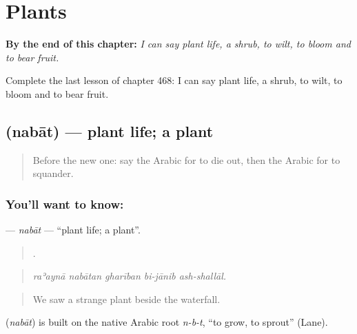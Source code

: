 
\chapter{Plants}
\label{ch:ar-plants}

\begin{chapteropening}
\textbf{By the end of this chapter:} \emph{I can say plant life, a shrub, to wilt, to bloom and to bear fruit.}

Complete the last lesson of chapter 468: I can say plant life, a shrub, to wilt, to bloom and to bear fruit.
\end{chapteropening}

\section[\texorpdfstring{\ar{نبات} (nabāt)}{نبات (nabāt)}]{ (nabāt) — plant life; a plant}

\label{lesson:AR-C468-nabat}



\begin{quote}
Before the new one: say the Arabic for to die out, then the Arabic for to squander.
\end{quote}

\subsection*{You'll want to know: }
\textbf{} — \emph{nabāt} — \textquotedblleft{}plant life; a plant\textquotedblright{}.

\begin{quote}
    .
\end{quote}

\begin{quote}
\emph{raʾaynā nabātan gharīban bi-jānib ash-shallāl.}
\end{quote}

\begin{quote}
We saw a strange plant beside the waterfall.
\end{quote}

\begin{cousinweb}
\textbf{} (\emph{nabāt}) is built on the native Arabic root \emph{n-b-t}, \textquotedblleft{}to grow, to sprout\textquotedblright{} (Lane).
\end{cousinweb}

